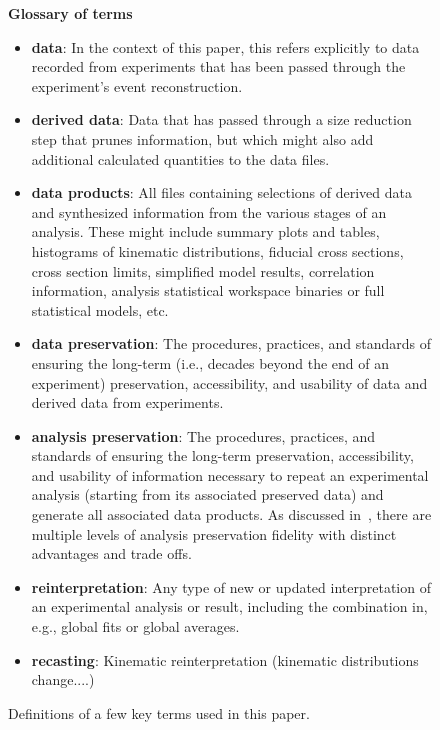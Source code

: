 \documentclass[11pt]{article}
\begin{document}
\begin{figure}[!ht]
\begin{tcolorbox}
\begin{center}
{\large \textbf{Glossary of terms}}
\end{center}
%
\begin{itemize}
    \item \textbf{\Gls{data}}: In the context of this paper, this refers explicitly to data recorded from experiments that has been passed through the experiment's event reconstruction.
    \item \textbf{\Gls{derived data}}: Data that has passed through a size reduction step that prunes information, but which might also add additional calculated quantities to the data files.
    \item \textbf{\Gls{data products}}: All files containing selections of derived data and synthesized information from the various stages of an analysis.
These might include summary plots and tables, histograms of kinematic distributions, fiducial cross sections, cross section limits, simplified model results, correlation information, analysis statistical workspace binaries or full statistical models, etc.
    \item \textbf{\Gls{data preservation}}: The procedures, practices, and standards of ensuring the long-term (i.e., decades beyond the end of an experiment) preservation, accessibility, and usability of data and derived data from experiments.
    \item \textbf{\Gls{analysis preservation}}: The procedures, practices, and standards of ensuring the long-term preservation, accessibility, and usability of information necessary to repeat an experimental analysis (starting from its associated preserved data) and generate all associated \gls{data products}.
    As discussed in~, there are multiple levels of analysis preservation fidelity with distinct advantages and trade offs.
    \item \textbf{\Gls{reinterpretation}}: Any type of new or updated interpretation of an experimental analysis or result, including the combination in, e.g., global fits or global averages. 
    \item \textbf{\Gls{recasting}}: Kinematic reinterpretation (kinematic distributions change....) %
\end{itemize}
\end{tcolorbox}
\caption{Definitions of a few key terms used in this paper.}
\label{fig:glossary}
\end{figure}
\end{document}
